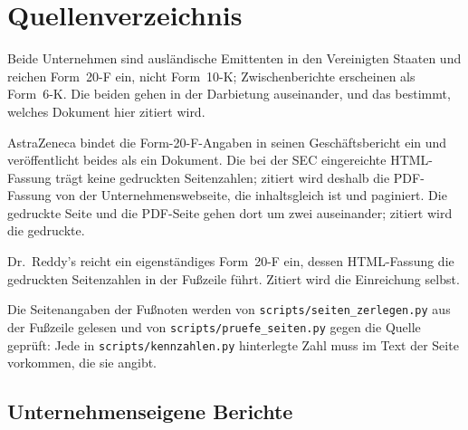 \section*{Quellenverzeichnis}

Beide Unternehmen sind ausl\"andische Emittenten in den Vereinigten Staaten
und reichen Form~20-F ein, nicht Form~10-K; Zwischenberichte erscheinen als
Form~6-K. Die beiden gehen in der Darbietung auseinander, und das bestimmt,
welches Dokument hier zitiert wird.

AstraZeneca bindet die Form-20-F-Angaben in seinen Gesch\"aftsbericht ein und
ver\"offentlicht beides als ein Dokument. Die bei der SEC eingereichte
HTML-Fassung tr\"agt keine gedruckten Seitenzahlen; zitiert wird deshalb die
PDF-Fassung von der Unternehmenswebseite, die inhaltsgleich ist und
paginiert. Die gedruckte Seite und die PDF-Seite gehen dort um zwei
auseinander; zitiert wird die gedruckte.

Dr.~Reddy's reicht ein eigenst\"andiges Form~20-F ein, dessen HTML-Fassung
die gedruckten Seitenzahlen in der Fu{\ss}zeile f\"uhrt. Zitiert wird die
Einreichung selbst.

Die Seitenangaben der Fu{\ss}noten werden von
\texttt{scripts/seiten\_zerlegen.py} aus der Fu{\ss}zeile gelesen und von
\texttt{scripts/pruefe\_seiten.py} gegen die Quelle gepr\"uft: Jede in
\texttt{scripts/kennzahlen.py} hinterlegte Zahl muss im Text der Seite
vorkommen, die sie angibt.

\subsection*{Unternehmenseigene Berichte}

